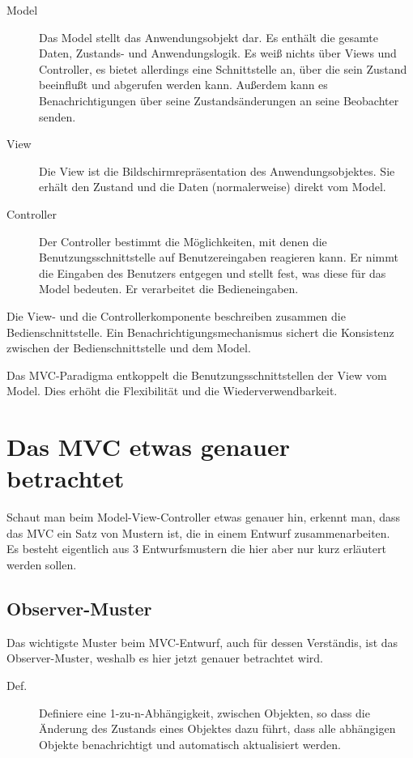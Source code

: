 \documentclass[11pt,a4paper,titlepage]{scrreprt}
\begin{document}
\begin{description}
\item[Model]
Das  Model stellt das Anwendungsobjekt dar. Es enthält die gesamte Daten, Zustands-
und Anwendungslogik. Es weiß nichts über Views und Controller, es bietet allerdings eine
Schnittstelle an, über die sein Zustand beeinflußt und abgerufen werden kann. Außerdem
kann es Benachrichtigungen über seine Zustandsänderungen an seine Beobachter senden.

\item[View]
Die View ist die Bildschirmrepräsentation des Anwendungsobjektes. Sie erhält den Zustand
und die Daten (normalerweise) direkt vom Model.

\item[Controller]
Der Controller bestimmt die Möglichkeiten, mit denen die Benutzungsschnittstelle auf
Benutzereingaben reagieren kann. Er nimmt die Eingaben des Benutzers entgegen und stellt
fest, was diese für das Model bedeuten. Er verarbeitet die Bedieneingaben.
\end{description}

Die View- und die Controllerkomponente beschreiben zusammen die Bedienschnittstelle.
Ein Benachrichtigungsmechanismus sichert die Konsistenz zwischen der Bedienschnittstelle
und dem Model.

Das MVC-Paradigma entkoppelt die Benutzungsschnittstellen der View vom Model. Dies
erhöht die Flexibilität und die Wiederverwendbarkeit.

\section{Das MVC etwas genauer betrachtet}
Schaut man beim Model-View-Controller etwas genauer hin, erkennt man, dass das MVC
ein Satz von Mustern ist, die in einem Entwurf zusammenarbeiten.\\
Es besteht eigentlich aus 3 Entwurfsmustern die hier aber nur kurz erläutert werden
sollen.

\subsection{Observer-Muster}
Das wichtigste Muster beim MVC-Entwurf, auch für dessen Verständis, ist das Observer-Muster,
weshalb es hier jetzt genauer betrachtet wird.

\begin{description}
\item[Def.]
Definiere eine 1-zu-n-Abhängigkeit, zwischen Objekten, so dass die Änderung des
Zustands eines Objektes dazu führt, dass alle abhängigen Objekte benachrichtigt
und automatisch aktualisiert werden.
\end{description}
\end{document}
